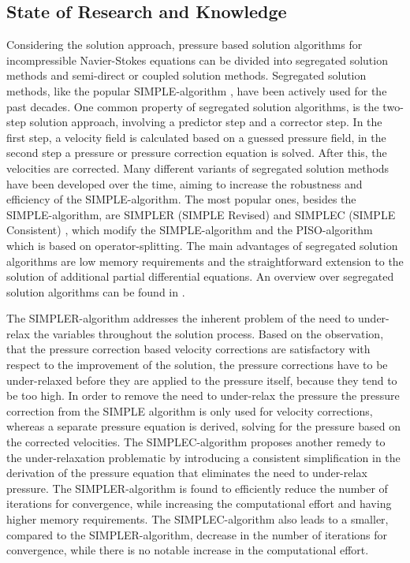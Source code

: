 \subsection{State of Research and Knowledge}

Considering the solution approach, pressure based solution algorithms for incompressible Navier-Stokes equations can be divided into segregated solution methods and semi-direct or coupled solution methods. Segregated solution methods, like the popular SIMPLE-algorithm \cite{patankar72}, have been actively used for the past decades. One common property of segregated solution algorithms, is the two-step solution approach, involving a predictor step and a corrector step. In the first step, a velocity field is calculated based on a guessed pressure field, in the second step a pressure or pressure correction equation is solved. After this, the velocities are corrected. Many different variants of segregated solution methods have been developed over the time, aiming to increase the robustness and efficiency of the SIMPLE-algorithm. The most popular ones, besides the SIMPLE-algorithm, are SIMPLER (SIMPLE Revised) \cite{patankar80} and SIMPLEC (SIMPLE Consistent) \cite{doormaal84}, which modify the SIMPLE-algorithm and the PISO-algorithm which is based on operator-splitting. The main advantages of segregated solution algorithms are low memory requirements and the straightforward extension to the solution of additional partial differential equations. An overview over segregated solution algorithms can be found in \cite{darwish00}.

The SIMPLER-algorithm addresses the inherent problem of the need to under-relax the variables throughout the solution process. Based on the observation, that the pressure correction based velocity corrections are satisfactory with respect to the improvement of the solution, the pressure corrections have to be under-relaxed before they are applied to the pressure itself, because they tend to be too high. In order to remove the need to under-relax the pressure the pressure correction from the SIMPLE algorithm is only used for velocity corrections, whereas a separate pressure equation is derived, solving for the pressure based on the corrected velocities. The SIMPLEC-algorithm proposes another remedy to the under-relaxation problematic by introducing a consistent simplification in the derivation of the pressure equation that eliminates the need to under-relax pressure. The SIMPLER-algorithm is found to efficiently reduce the number of iterations for convergence, while increasing the computational effort and having higher memory requirements. The SIMPLEC-algorithm also leads to a smaller, compared to the SIMPLER-algorithm, decrease in the number of iterations for convergence, while there is no notable increase in the computational effort. 

